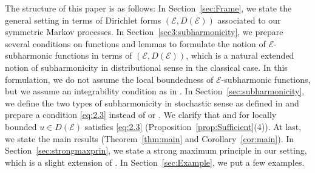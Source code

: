 \documentclass[12pt,a4paper]{article}
\newcommand{\1}{{\bf 1}}
\begin{document}
The structure of this paper is as follows: In Section~\ref{sec:Frame}, we state the general setting in terms of Dirichlet forms $(\mathscr{E},D(\mathscr{E}))$ associated to our symmetric Markov processes. 
In Section~\ref{sec3:subharmonicity}, we 
prepare several conditions on functions and lemmas to formulate  
the notion of $\mathscr{E}$-subharmonic functions in terms of $(\mathscr{E},D(\mathscr{E}))$, which is a natural extended notion of 
subharmonicity in distributional sense in the classical case. In this formulation, we do not assume the local boundedness of $\mathscr{E}$-subharmonic functions, but we assume an integrability condition as in \cite[(2.5)]{CK}.    
In Section~\ref{sec:subharmonicity}, we define the two types of subharmonicity in stochastic sense as defined in \cite{CK} and prepare a condition \eqref{eq:2.3} 
instead of \cite[(2.5)]{Chen} or \cite[(2.3)]{CK}. We clarify that 
\cite[(2.5)]{Chen} and \cite[(2.3)]{CK} for locally bounded $u\in D(\mathscr{E})$ 
satisfies \eqref{eq:2.3} (Proposition~\ref{prop:Sufficient}(4)).  
At last, we state the main results (Theorem~\ref{thm:main} and Corollary~\ref{cor:main}). 
In Section~\ref{sec:strongmaxprin}, we state a strong maximum principle in our setting, which is a slight extension of \cite[Theorem~2.11]{CK}. 
In Section~\ref{sec:Example}, we put a few examples. 
    
\end{document}
